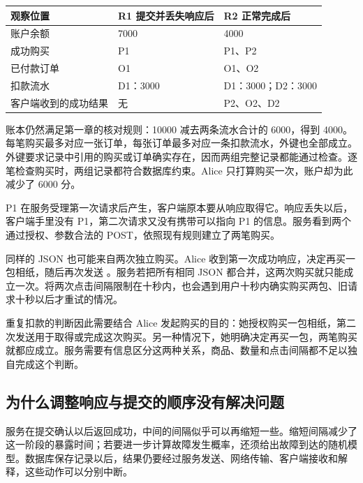 \begin{center}
\begin{minipage}{\linewidth}
\centering\small\captionsetup{hypcap=false}
\begin{tabularx}{\linewidth}{p{.24\linewidth}XX}
\toprule
\textbf{观察位置} & \textbf{R1 提交并丢失响应后} & \textbf{R2 正常完成后} \\
\midrule
账户余额 & 7000 & 4000 \\
成功购买 & P1 & P1、P2 \\
已付款订单 & O1 & O1、O2 \\
扣款流水 & D1：3000 & D1：3000；D2：3000 \\
客户端收到的成功结果 & 无 & P2、O2、D2 \\
\bottomrule
\end{tabularx}
\end{minipage}
\end{center}

账本仍然满足第一章的核对规则：10000 减去两条流水合计的 6000，得到 4000。每笔购买最多对应一张订单，每张订单最多对应一条扣款流水，外键也全部成立。外键要求记录中引用的购买或订单确实存在，因而两组完整记录都能通过检查。逐笔检查购买时，两组记录都符合数据库约束。Alice 只打算购买一次，账户却为此减少了 6000 分。



P1 在服务受理第一次请求后产生，客户端原本要从响应取得它。响应丢失以后，客户端手里没有 P1，第二次请求又没有携带可以指向 P1 的信息。服务看到两个通过授权、参数合法的 POST，依照现有规则建立了两笔购买。

同样的 JSON 也可能来自两次独立购买。Alice 收到第一次成功响应，决定再买一包相纸，随后再次发送 。服务若把所有相同 JSON 都合并，这两次购买就只能成立一次。将两次点击间隔限制在十秒内，也会遇到用户十秒内确实购买两包、旧请求十秒以后才重试的情况。



重复扣款的判断因此需要结合 Alice 发起购买的目的：她授权购买一包相纸，第二次发送用于取得或完成这次购买。另一种情况下，她明确决定再买一包，两笔购买就都应成立。服务需要有信息区分这两种关系，商品、数量和点击间隔都不足以独自完成这个判断。

\subsection*{为什么调整响应与提交的顺序没有解决问题}

服务在提交确认以后返回成功，中间的间隔似乎可以再缩短一些。缩短间隔减少了这一阶段的暴露时间；若要进一步计算故障发生概率，还须给出故障到达的随机模型。数据库保存记录以后，结果仍要经过服务发送、网络传输、客户端接收和解释，这些动作可以分别中断。

